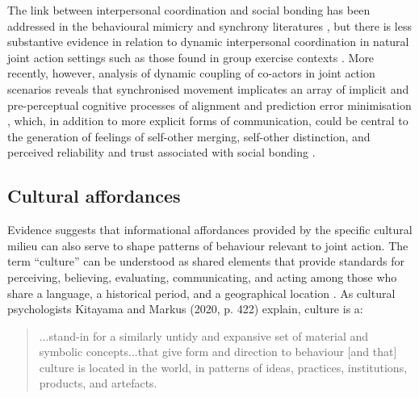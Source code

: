 \begin{CJK}{UTF8}{gbsn}
The link between interpersonal coordination and social bonding has been addressed in the behavioural mimicry and synchrony literatures \citep[e.g.,][]{Wheatley2012,Launay2016,Mogan2017}, but there is less substantive evidence in relation to dynamic interpersonal coordination in natural joint action settings such as those found in group exercise contexts \citep{Marsh2009,Miles2009,Lumsden2012}.  More recently, however, analysis of dynamic coupling of co-actors in joint action scenarios reveals that synchronised movement implicates an array of implicit and pre-perceptual cognitive processes of alignment and prediction error minimisation \citep{Schmidt2011}, which, in addition to more explicit forms of communication, could be central to the generation of feelings of self-other merging, self-other distinction, and perceived reliability and trust associated with social bonding \citep{Marsh2009}.







\subsection{Cultural affordances}

Evidence suggests that informational affordances provided by the specific cultural milieu can also serve to shape patterns of behaviour relevant to joint action.  The term ``culture'' can be understood as shared elements that provide standards for perceiving, believing, evaluating, communicating, and acting among those who share a language, a historical period, and a geographical location \citep{Triandis1996}.  As cultural psychologists Kitayama and Markus (2020, p. 422) explain, culture is a:

\begin{quote}
  ...stand-in for a similarly untidy and expansive set of material and symbolic concepts...that give form and direction to behaviour [and that] culture is located in the world, in patterns of ideas, practices, institutions, products, and artefacts.
\end{quote}


\end{CJK}
